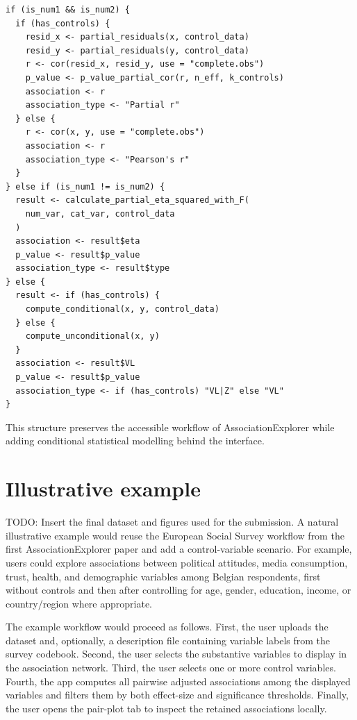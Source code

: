 \documentclass[11pt,a4paper]{article}
\begin{document}
\begin{verbatim}
if (is_num1 && is_num2) {
  if (has_controls) {
    resid_x <- partial_residuals(x, control_data)
    resid_y <- partial_residuals(y, control_data)
    r <- cor(resid_x, resid_y, use = "complete.obs")
    p_value <- p_value_partial_cor(r, n_eff, k_controls)
    association <- r
    association_type <- "Partial r"
  } else {
    r <- cor(x, y, use = "complete.obs")
    association <- r
    association_type <- "Pearson's r"
  }
} else if (is_num1 != is_num2) {
  result <- calculate_partial_eta_squared_with_F(
    num_var, cat_var, control_data
  )
  association <- result$eta
  p_value <- result$p_value
  association_type <- result$type
} else {
  result <- if (has_controls) {
    compute_conditional(x, y, control_data)
  } else {
    compute_unconditional(x, y)
  }
  association <- result$VL
  p_value <- result$p_value
  association_type <- if (has_controls) "VL|Z" else "VL"
}
\end{verbatim}

This structure preserves the accessible workflow of AssociationExplorer while adding conditional statistical modelling behind the interface.

\section{Illustrative example}
\label{sec:example}

TODO: Insert the final dataset and figures used for the submission. A natural illustrative example would reuse the European Social Survey workflow from the first AssociationExplorer paper and add a control-variable scenario. For example, users could explore associations between political attitudes, media consumption, trust, health, and demographic variables among Belgian respondents, first without controls and then after controlling for age, gender, education, income, or country/region where appropriate.

The example workflow would proceed as follows. First, the user uploads the dataset and, optionally, a description file containing variable labels from the survey codebook. Second, the user selects the substantive variables to display in the association network. Third, the user selects one or more control variables. Fourth, the app computes all pairwise adjusted associations among the displayed variables and filters them by both effect-size and significance thresholds. Finally, the user opens the pair-plot tab to inspect the retained associations locally.
\end{document}
